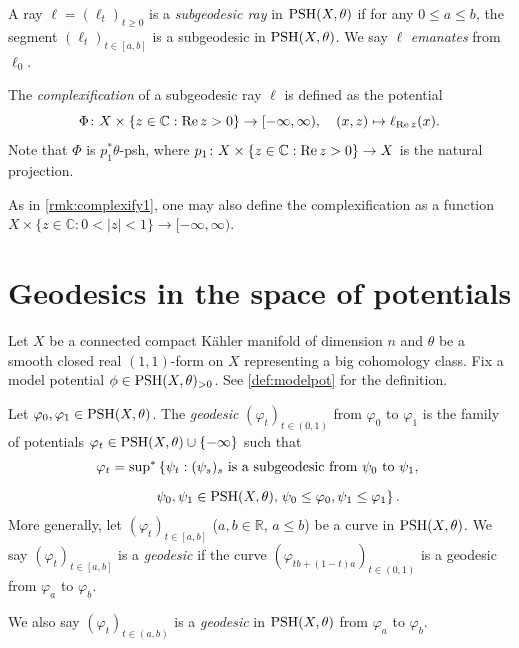 \begin{definition}\label{def:subgeoray}
    A ray $\ell=(\ell_t)_{t\geq 0}$ is a \emph{subgeodesic ray} in $\mathrm{PSH}(X,\theta)$ if for any $0\leq a\leq b$, the segment $(\ell_{t})_{t\in [a,b]}$ is a subgeodesic in $\mathrm{PSH}(X,\theta)$. We say $\ell$ \emph{emanates} from $\ell_0$.

    The \emph{complexification} of a subgeodesic ray $\ell$ is defined as the potential
    \[
    \Phi\colon X\times \{z\in \mathbb{C}:\operatorname{Re} z>0\}\rightarrow [-\infty,\infty),\quad (x,z)\mapsto \ell_{\operatorname{Re} z}(x).
    \]
    Note that $\Phi$ is $p_1^*\theta$-psh, where $p_1\colon X\times \{z\in \mathbb{C}:\operatorname{Re} z>0\}\rightarrow X$ is the natural projection.
\end{definition}
\begin{remark}
    As in \cref{rmk:complexify1}, one may also define the complexification as a function $X\times \{z\in \mathbb{C}: 0<|z|<1\}\rightarrow [-\infty,\infty)$.
\end{remark}



\section{Geodesics in the space of potentials}\label{sec:relativeray}
Let $X$ be a connected compact Kähler manifold of dimension $n$ and $\theta$ be a smooth closed real $(1,1)$-form on $X$ representing a big cohomology class.
Fix a model potential $\phi\in \mathrm{PSH}(X,\theta)_{>0}$. See \cref{def:modelpot} for the definition.

\begin{definition}\label{def:geo}
    Let $\varphi_0, \varphi_1 \in \mathrm{PSH}(X,\theta)$. The \emph{geodesic} $(\varphi_t)_{t\in (0,1)}$ from $\varphi_0$ to $\varphi_1$ is the family of potentials $\varphi_t\in \mathrm{PSH}(X,\theta)\cup \{-\infty\}$ such that
    \begin{equation}\label{eq:Perron2}
        \begin{split}
        \varphi_t=\operatorname*{sup}_{}{}\!{}^{*} & \left\{  \psi_t: (\psi_{s})_s \textup{ is a subgeodesic from }\psi_0\textup{ to }\psi_1,\right.\\
        &\psi_0,\psi_1\in \mathrm{PSH}(X,\theta),\left.\psi_0\leq \varphi_0,\psi_1\leq \varphi_1\right\}.
        \end{split}
    \end{equation}
    More generally, let $(\varphi_t)_{t\in [a,b]}$ ($a,b\in \mathbb{R}$, $a\leq b$) be a curve in $\mathrm{PSH}(X,\theta)$. We say $(\varphi_t)_{t\in [a,b]}$ is a \emph{geodesic} if the curve $(\varphi_{tb+(1-t)a})_{t\in (0,1)}$ is a geodesic from $\varphi_a$ to $\varphi_b$.

    We also say $(\varphi_t)_{t\in (a,b)}$ is a \emph{geodesic} in $\mathrm{PSH}(X,\theta)$ from $\varphi_a$ to $\varphi_b$.
\end{definition}

